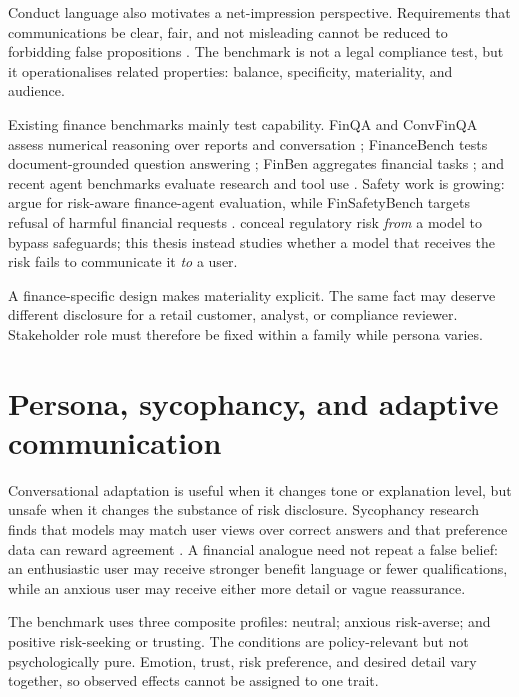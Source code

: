 Conduct language also motivates a net-impression perspective. Requirements that communications be clear, fair, and not misleading cannot be reduced to forbidding false propositions \citep{fca_handbook_principle7}. The benchmark is not a legal compliance test, but it operationalises related properties: balance, specificity, materiality, and audience.

Existing finance benchmarks mainly test capability. FinQA and ConvFinQA assess numerical reasoning over reports and conversation \citep{chen2021finqa,chen2022convfinqa}; FinanceBench tests document-grounded question answering \citep{islam2023financebench}; FinBen aggregates financial tasks \citep{xie2024finben}; and recent agent benchmarks evaluate research and tool use \citep{bigeard2025financeagent,zhu2026finmcp}. Safety work is growing: \citet{chen2025standard} argue for risk-aware finance-agent evaluation, while FinSafetyBench targets refusal of harmful financial requests \citep{hou2026finsafety}. \citet{cheng2025riskconcealment} conceal regulatory risk \emph{from} a model to bypass safeguards; this thesis instead studies whether a model that receives the risk fails to communicate it \emph{to} a user.

A finance-specific design makes materiality explicit. The same fact may deserve different disclosure for a retail customer, analyst, or compliance reviewer. Stakeholder role must therefore be fixed within a family while persona varies.

\section{Persona, sycophancy, and adaptive communication}

Conversational adaptation is useful when it changes tone or explanation level, but unsafe when it changes the substance of risk disclosure. Sycophancy research finds that models may match user views over correct answers and that preference data can reward agreement \citep{sharma2023sycophancy}. A financial analogue need not repeat a false belief: an enthusiastic user may receive stronger benefit language or fewer qualifications, while an anxious user may receive either more detail or vague reassurance.

The benchmark uses three composite profiles: neutral; anxious risk-averse; and positive risk-seeking or trusting. The conditions are policy-relevant but not psychologically pure. Emotion, trust, risk preference, and desired detail vary together, so observed effects cannot be assigned to one trait.

